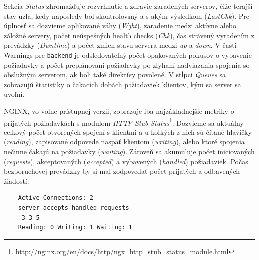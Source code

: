 \documentclass[12pt, a4paper]{article}
\begin{document}
Sekcia \emph{Status} zhromažďuje rozvrhnutie a zdravie zaradených serverov, čiže terajší stav uzla, kedy 
naposledy bol skontrolovaný a s akým výsledkom (\emph{LastChk}). Pre úplnosť sa dozvieme aplikované váhy 
(\emph{Wght}), zaradenie medzi aktívne alebo záložné servery, počet neúspešných health checks (\emph{Chk}), 
čas strávený vyradením z prevádzky (\emph{Dwntime}) a počet zmien stavu servera medzi \emph{up} a 
\emph{down}. V časti Warnings pre \verb|backend| je odsledovateľný počet opakovaných pokusov o vybavenie 
požiadavky a počet preplánovaní požiadavky po zlyhaní nadviazania spojenia so obslužným serverom, 
ak boli také direktívy povolené. V stĺpci \emph{Queues} sa zobrazujú štatistiky o čakacích dobách požiadaviek 
klientov, kým sa server sa uvoľní.

NGINX, vo voľne prístupnej verzii, zobrazuje iba najzákladnejšie metriky o prijatých
požiadavkách s modulom \emph{HTTP Stub Status}\footnote{
\url{http://nginx.org/en/docs/http/ngx_http_stub_status_module.html}}. Dozvieme sa 
aktuálny celkový počet otvorených spojení s klientmi a u koľkých z nich sú čítané hlavičky (\emph{reading}), 
zapisované odpovede naspäť klientom (\emph{writing}), alebo ktoré spojenia nečinne čakajú na 
požiadavky (\emph{waiting}). Zároveň sa akumuluje počet iniciovaných (\emph{requests}), akceptovaných 
(\emph{accepted}) a vybavených (\emph{handled}) požiadaviek. Počas bezporuchovej prevádzky by si mal 
zodpovedať počet prijatých a odbavených žiadostí:

\begin{lstlisting}
	Active Connections: 2
	server accepts handled requests
 	 3 3 5
	Reading: 0 Writing: 1 Waiting: 1
\end{lstlisting}
\end{document}
